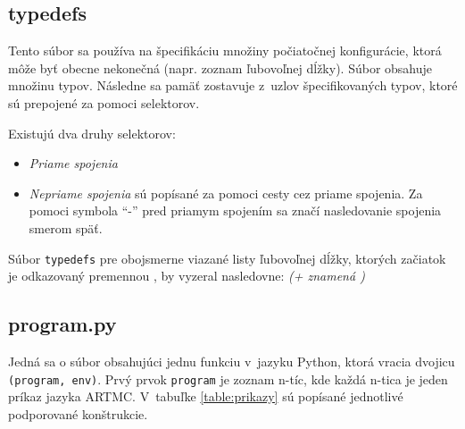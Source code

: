 \subsection{typedefs}
Tento súbor sa používa na špecifikáciu množiny počiatočnej konfigurácie, ktorá môže byť obecne nekonečná (napr. zoznam ľubovoľnej dĺžky). Súbor obsahuje množinu typov. Následne sa pamäť zostavuje z~uzlov špecifikovaných typov, ktoré sú prepojené za pomoci selektorov.
\newpage

Existujú dva druhy selektorov:
\begin{itemize}
\item \textit{Priame spojenia}
\item \textit{Nepriame spojenia} sú popísané za pomoci cesty cez priame spojenia. Za pomoci symbola ``-'' pred priamym spojením sa značí nasledovanie spojenia smerom späť.
\end{itemize}

Súbor \texttt{typedefs} pre obojsmerne viazané listy ľubovoľnej dĺžky, ktorých začiatok je odkazovaný premennou , by vyzeral nasledovne: \textit{(+ znamená )}


\subsection{program.py}
Jedná sa o súbor obsahujúci jednu funkciu v~jazyku Python, ktorá vracia dvojicu \texttt{(program, env)}.
Prvý prvok \texttt{program} je zoznam n-tíc, kde každá n-tica je jeden príkaz jazyka ARTMC. V~tabuľke \ref{table:prikazy} sú popísané jednotlivé podporované konštrukcie.

